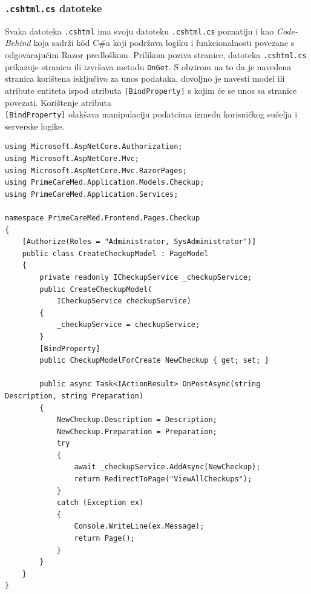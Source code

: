 \subsubsection{\texttt{.cshtml.cs} datoteke}
\label{subsubsec:.cshtml.cs}
Svaka datoteka \texttt{.cshtml} ima svoju datoteku \texttt{.cshtml.cs} poznatiju i kao \textit{Code-Behind} koja sadrži k\^od C\#a koji podržava logiku i funkcionalnosti povezane s odgovarajućim Razor predloškom. Prilikom poziva stranice, datoteka \texttt{.cshtml.cs} prikazuje stranicu ili izvršava metodu \texttt{OnGet}. S obzirom na to da je navedena stranica korištena isključivo za unos podataka, dovoljno je navesti model ili atribute entiteta ispod atributa \texttt{[BindProperty]} s kojim će se unos sa stranice povezati. Korištenje atributa \\\texttt{[BindProperty]} olakšava manipulaciju podatcima između korisničkog sučelja i serverske logike.

\begin{lstlisting}[caption={Datoteka \texttt{CreateCheckup.cshtml.cs}}, label=createCheckupCs]
using Microsoft.AspNetCore.Authorization;
using Microsoft.AspNetCore.Mvc;
using Microsoft.AspNetCore.Mvc.RazorPages;
using PrimeCareMed.Application.Models.Checkup;
using PrimeCareMed.Application.Services;

namespace PrimeCareMed.Frontend.Pages.Checkup
{
    [Authorize(Roles = "Administrator, SysAdministrator")]
    public class CreateCheckupModel : PageModel
    {
        private readonly ICheckupService _checkupService;
        public CreateCheckupModel(
            ICheckupService checkupService)
        {
            _checkupService = checkupService;
        }
        [BindProperty]
        public CheckupModelForCreate NewCheckup { get; set; }

        public async Task<IActionResult> OnPostAsync(string Description, string Preparation)
        {
            NewCheckup.Description = Description;
            NewCheckup.Preparation = Preparation;
            try
            {
                await _checkupService.AddAsync(NewCheckup);
                return RedirectToPage("ViewAllCheckups");
            }
            catch (Exception ex)
            {
                Console.WriteLine(ex.Message);
                return Page();
            }   
        }
    }
}
\end{lstlisting}

